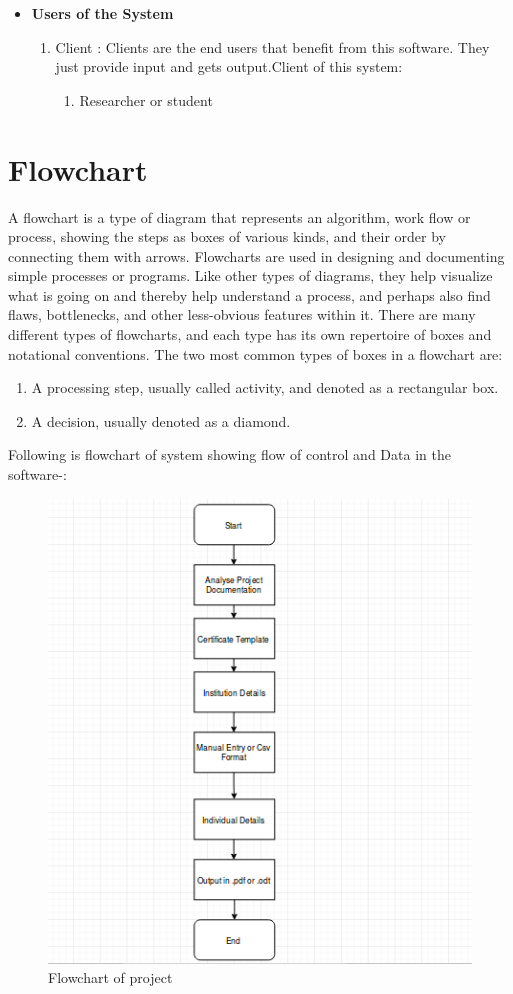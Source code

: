\begin{itemize}
\item{\bf Users of the System}
\begin{enumerate} 
\item Client : Clients are the end users that benefit from this software.
They just provide input and gets output.Client of this system:
\begin{enumerate}
\item Researcher or student
\end{enumerate}
\end{enumerate}
\end{itemize}
\section{Flowchart}
A flowchart is a type of diagram that represents an algorithm, work flow or process, showing the steps as boxes of various kinds, and their order by connecting them with arrows. 
Flowcharts are used in designing and documenting simple processes or programs. Like other types of diagrams, they help visualize what is going on and thereby help understand a process, and perhaps also find flaws, bottlenecks, and other less-obvious features within it. There are many different types of flowcharts, and each type has its own repertoire of boxes and notational conventions. The two most common types of boxes in a flowchart are:
\begin{enumerate}
\item A processing step, usually called activity, and denoted as a rectangular box.
\item A decision, usually denoted as a diamond.
\end{enumerate}
Following is flowchart of system showing flow of control and Data in the software-:
\begin{figure}[!ht]
\centering
\includegraphics[width=1\textwidth]{images/design.png}                   
\caption{Flowchart of project}
\hspace{-1.5em}
\end{figure}

